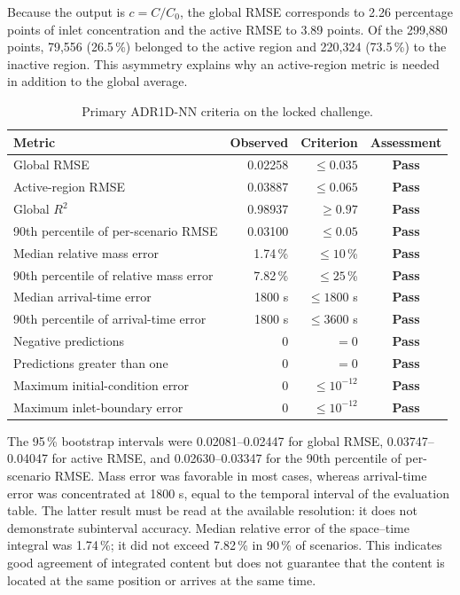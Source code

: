 \documentclass[11pt,a4paper]{article}
\newcommand{\pass}{\textcolor{adrgreen}{\textbf{Pass}}}
\begin{document}
Because the output is $c=C/C_0$, the global RMSE corresponds to 2.26 percentage
points of inlet concentration and the active RMSE to 3.89 points. Of the
299,880 points, 79,556 (26.5\,\%) belonged to the active region and 220,324
(73.5\,\%) to the inactive region. This asymmetry explains why an active-region
metric is needed in addition to the global average.

\begin{table}[htbp]
\centering
\caption{Primary ADR1D-NN criteria on the locked challenge.}
\label{tab:nncriteria}
\small
\begin{tabularx}{\textwidth}{@{}YrrC@{}}
\toprule
Metric & Observed & Criterion & Assessment \\
\midrule
Global RMSE & 0.02258 & $\leq0.035$ & \pass \\
Active-region RMSE & 0.03887 & $\leq0.065$ & \pass \\
Global $R^2$ & 0.98937 & $\geq0.97$ & \pass \\
90th percentile of per-scenario RMSE & 0.03100 & $\leq0.05$ & \pass \\
Median relative mass error & 1.74\,\% & $\leq10$\,\% & \pass \\
90th percentile of relative mass error & 7.82\,\% & $\leq25$\,\% & \pass \\
Median arrival-time error & 1800 s & $\leq1800$ s & \pass \\
90th percentile of arrival-time error & 1800 s & $\leq3600$ s & \pass \\
Negative predictions & 0 & $=0$ & \pass \\
Predictions greater than one & 0 & $=0$ & \pass \\
Maximum initial-condition error & 0 & $\leq10^{-12}$ & \pass \\
Maximum inlet-boundary error & 0 & $\leq10^{-12}$ & \pass \\
\bottomrule
\end{tabularx}
\end{table}

The 95\,\% bootstrap intervals were 0.02081--0.02447 for global RMSE,
0.03747--0.04047 for active RMSE, and 0.02630--0.03347 for the 90th percentile
of per-scenario RMSE. Mass error was favorable in most cases, whereas
arrival-time error was concentrated at 1800 s, equal to the temporal interval
of the evaluation table. The latter result must be read at the available
resolution: it does not demonstrate subinterval accuracy. Median relative
error of the space--time integral was 1.74\,\%; it did not exceed 7.82\,\% in
90\,\% of scenarios. This indicates good agreement of integrated content but
does not guarantee that the content is located at the same position or arrives
at the same time.
\end{document}
